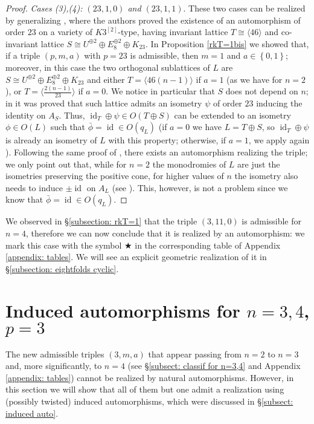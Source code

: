 \documentclass{amsart}
\theoremstyle{definition}
\newcommand{\hsk}{K3^{\left[2\right]}}
\DeclareMathOperator{\id}{id}
\begin{document}
\begin{proof}
\emph{Cases (3),(4): $(23,1,0)$ and $(23,1,1)$}. These two cases can be realized by generalizing \cite{bcms_p=23}, where the authors proved the existence of an automorphism of order $23$ on a variety of $\hsk$-type, having invariant lattice $T \cong \langle 46 \rangle$ and co-invariant lattice $S \cong U^{\oplus 2} \oplus E_8^{\oplus 2} \oplus K_{23}$. In Proposition \ref{rkT=1bis} we showed that, if a triple $(p,m,a)$ with $p=23$ is admissible, then $m=1$ and $a \in \left\{ 0,1 \right\}$; moreover, in this case the two orthogonal sublattices of $L$ are $S \cong U^{\oplus 2} \oplus E_8^{\oplus 2} \oplus K_{23}$ and either $T=\langle46(n-1)\rangle$ if $a=1$ (as we have for $n=2$), or $T=\langle \frac{2(n-1)}{23} \rangle$ if $a=0$. We notice in particular that $S$ does not depend on $n$; in \cite[Proposition 5.3]{bcms_p=23} it was proved that such lattice admits an isometry $\psi$ of order $23$ inducing the identity on $A_S$. Thus, $\id_T \oplus \psi \in O(T \oplus S)$ can be extended to an isometry $\phi \in O(L)$ such that $\bar{\phi} = \id \in O(q_L)$ (if $a=0$ we have $L=T \oplus S$, so $\id_T \oplus \psi$ is already an isometry of $L$ with this property; otherwise, if $a=1$, we apply again \cite[Corollary 1.5.2]{nikulin}). Following the same proof of \cite[Theorem 6.1]{bcms_p=23}, there exists an automorphism realizing the triple; we only point out that, while for $n=2$ the monodromies of $L$ are just the isometries preserving the positive cone, for higher values of $n$ the isometry also needs to induce $\pm \id$ on $A_L$ (see \cite[Lemma 9.2]{markman}). This, however, is not a problem since we know that $\bar{\phi} = \id \in O(q_L)$.
\end{proof}

We observed in \S \ref{subsection: rkT=1} that the triple $(3,11,0)$ is admissible for $n=4$, therefore we can now conclude that it is realized by an automorphism: we mark this case with the symbol $\bigstar$ in the corresponding table of Appendix \ref{appendix: tables}. We will see an explicit geometric realization of it in \S \ref{subsection: eightfolds cyclic}.


\section{Induced automorphisms for $n=3,4$, $p=3$} \label{section: induced for n=3,4}

The new admissible triples $(3,m,a)$ that appear passing from $n=2$ to $n=3$ and, more significantly, to $n=4$ (see \S \ref{subsect: classif for n=3,4} and Appendix \ref{appendix: tables}) cannot be realized by natural automorphisms. However, in this section we will show that all of them but one admit a realization using (possibly twisted) induced automorphisms, which were discussed in \S \ref{subsect: induced auto}.
\end{document}
